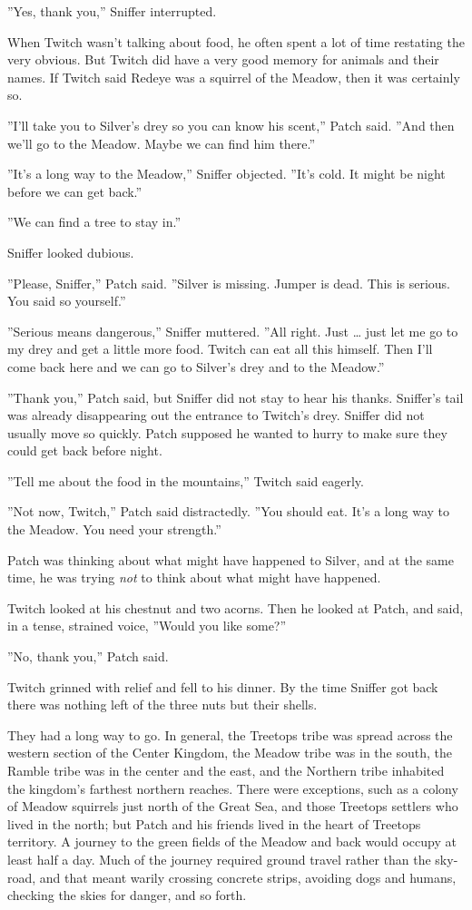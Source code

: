 \documentclass[12pt]{book}
\begin{document}
''Yes, thank you,'' Sniffer interrupted.

When Twitch wasn't talking about food, he often spent a lot of time restating the very obvious. But Twitch did have a very good memory for animals and their names. If Twitch said Redeye was a squirrel of the Meadow, then it was certainly so.

''I'll take you to Silver's drey so you can know his scent,'' Patch said. ''And then we'll go to the Meadow. Maybe we can find him there.''

''It's a long way to the Meadow,'' Sniffer objected. ''It's cold. It might be night before we can get back.''

''We can find a tree to stay in.''

Sniffer looked dubious.

''Please, Sniffer,'' Patch said. ''Silver is missing. Jumper is dead. This is serious. You said so yourself.''

''Serious means dangerous,'' Sniffer muttered. ''All right. Just \ldots{}
just let me go to my drey and get a little more food. Twitch can eat all this himself. Then I'll come back here and we can go to Silver's drey and to the Meadow.''

''Thank you,'' Patch said, but Sniffer did not stay to hear his thanks. Sniffer's tail was already disappearing out the entrance to Twitch's drey. Sniffer did not usually move so quickly. Patch supposed he wanted to hurry to make sure they could get back before night.

''Tell me about the food in the mountains,'' Twitch said eagerly.

''Not now, Twitch,'' Patch said distractedly. ''You should eat. It's a long way to the Meadow. You need your strength.''

Patch was thinking about what might have happened to Silver, and at the same time, he was trying {\it not} to think about what might have happened.

Twitch looked at his chestnut and two acorns. Then he looked at Patch, and said, in a tense, strained voice, ''Would you like some?''

''No, thank you,'' Patch said.

Twitch grinned with relief and fell to his dinner. By the time Sniffer got back there was nothing left of the three nuts but their shells.

They had a long way to go. In general, the Treetops tribe was spread across the western section of the Center Kingdom, the Meadow tribe was in the south, the Ramble tribe was in the center and the east, and the Northern tribe inhabited the kingdom's farthest northern reaches. There were exceptions, such as a colony of Meadow squirrels just north of the Great Sea, and those Treetops settlers who lived in the north; but Patch and his friends lived in the heart of Treetops territory. A journey to the green fields of the Meadow and back would occupy at least half a day. Much of the journey required ground travel rather than the sky-road, and that meant warily crossing concrete strips, avoiding dogs and humans, checking the skies for danger, and so forth.
\end{document}
